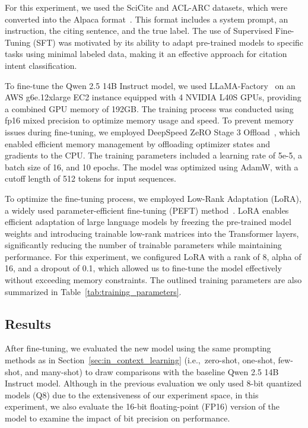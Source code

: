For this experiment, we used the SciCite and ACL-ARC datasets, which were converted into the Alpaca format~\citep{alpaca}. This format includes a system prompt, an instruction, the citing sentence, and the true label. 
The use of Supervised Fine-Tuning (SFT) was motivated by its ability to adapt pre-trained models to specific tasks using minimal labeled data, making it an effective approach for citation intent classification.

To fine-tune the Qwen 2.5 14B Instruct model, we used LLaMA-Factory~\citep{llamafactory} on an AWS g6e.12xlarge EC2 instance equipped with 4 NVIDIA L40S GPUs, providing a combined GPU memory of 192GB. The training process was conducted using fp16 mixed precision to optimize memory usage and speed. To prevent memory issues during fine-tuning, we employed DeepSpeed ZeRO Stage 3 Offload~\citep{deepspeed}, which enabled efficient memory management by offloading optimizer states and gradients to the CPU. The training parameters included a learning rate of 5e-5, a batch size of 16, and 10 epochs. The model was optimized using AdamW, with a cutoff length of 512 tokens for input sequences. 

To optimize the fine-tuning process, we employed Low-Rank Adaptation (LoRA), a widely used parameter-efficient fine-tuning (PEFT) method~\citep{lora, peft-survey}. LoRA enables efficient adaptation of large language models by freezing the pre-trained model weights and introducing trainable low-rank matrices into the Transformer layers, significantly reducing the number of trainable parameters while maintaining performance. For this experiment, we configured LoRA with a rank of 8, alpha of 16, and a dropout of 0.1, which allowed us to fine-tune the model effectively without exceeding memory constraints. The outlined training parameters are also summarized in Table~\ref{tab:training_parameters}.


\subsection{Results}

After fine-tuning, we evaluated the new model using the same prompting methods as in Section~\ref{sec:in_context_learning} (i.e.,~zero-shot, one-shot, few-shot, and many-shot) to draw comparisons with the baseline Qwen 2.5 14B Instruct model. Although in the previous evaluation we only used 8-bit quantized models (Q8) due to the extensiveness of our experiment space, in this experiment, we also evaluate the 16-bit floating-point (FP16) version of the model to examine the impact of bit precision on performance.

